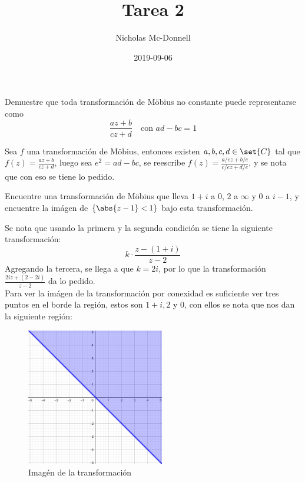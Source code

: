 \documentclass{homework}
\title{Tarea 2}
\date{2019-09-06}
\author{Nicholas Mc-Donnell}
\begin{document}
\maketitle
{}
\newpage
\tableofcontents
\newpage
{}
\begin{prob}
    Demuestre que toda transformación de Möbius no constante puede representarse como
    \[\frac{az+b}{cz+d}\quad\text{con }ad-bc=1\]
\end{prob}

\begin{sol}
    Sea \(f\) una transformación de Möbius, entonces existen \(a,b,c,d\in\set{C}\) tal que \(f(z)=\frac{az+b}{cz+d}\), luego sea \(e^2=ad-bc\), se reescribe \(f(z)=\frac{a/ez+b/e}{c/ez+d/e}\), y se nota que con eso se tiene lo pedido.
\end{sol}

\begin{prob}
    Encuentre una transformación de Möbius que lleva \(1+i\) a \(0\), \(2\) a \(\infty\) y \(0\) a \(i-1\), y encuentre la imágen de \(\{\abs{z-1}<1\}\) bajo esta transformación.
\end{prob}

\begin{sol}
    Se nota que usando la primera y la segunda condición se tiene la siguiente transformación:
    \begin{equation*}
        k\cdot\frac{z-(1+i)}{z-2}
    \end{equation*}
    Agregando la tercera, se llega a que \(k=2i\), por lo que la transformación \(\frac{2iz+(2-2i)}{z-2}\) da lo pedido.\\
    Para ver la imágen de la transformación por conexidad es suficiente ver tres puntos en el borde la región, estos son \(1+i,2\) y \(0\), con ellos se nota que nos dan la siguiente región:
    \begin{figure}[H]
        \centering
        \includegraphics[width=6cm, height=6cm]{geogebra-export.png}
        \caption{Imagén de la transformación}
    \end{figure}
\end{sol}
\end{document}

